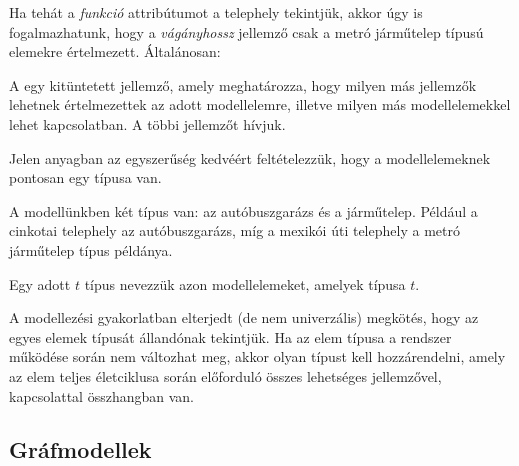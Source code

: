 Ha tehát a \textit{funkció} attribútumot a telephely  tekintjük, akkor úgy is fogalmazhatunk, hogy a \textit{vágányhossz} jellemző csak a \textsf{metró járműtelep} típusú elemekre értelmezett. Általánosan:

\begin{definicio}
	A  egy kitüntetett jellemző, amely meghatározza, hogy milyen más jellemzők lehetnek értelmezettek az adott modellelemre, illetve milyen más modellelemekkel lehet kapcsolatban. A többi jellemzőt  hívjuk.

\begin{megjegyzes}
	Jelen anyagban az egyszerűség kedvéért feltételezzük, hogy a modellelemeknek pontosan egy típusa van.
\end{megjegyzes}
\end{definicio}


A modellünkben két típus van: az \textsf{autóbuszgarázs} és a \textsf{járműtelep}. Például a cinkotai telephely az \textsf{autóbuszgarázs}, míg a mexikói úti telephely a \textsf{metró járműtelep} típus példánya.

\begin{definicio}
Egy adott $t$ típus  nevezzük azon modellelemeket, amelyek típusa $t$.
\end{definicio}

A modellezési gyakorlatban elterjedt (de nem univerzális) megkötés, hogy az egyes elemek típusát állandónak tekintjük. Ha az elem típusa a rendszer működése során nem változhat meg, akkor olyan típust kell hozzárendelni, amely az elem teljes életciklusa során előforduló összes lehetséges jellemzővel, kapcsolattal összhangban van.

\subsection{Gráfmodellek}

